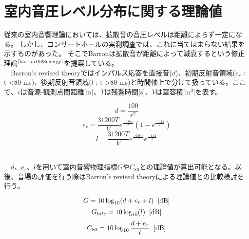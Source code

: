 \pagebreak
\section{室内音圧レベル分布に関する理論値}
従来の室内音響理論においては、拡散音の音圧レベルは距離によらず一定になる。
しかし、コンサートホールの実測調査では、これに当てはまらない結果を示すものがあった。
そこでBarronは拡散音が距離によって減衰するという修正理論$^{\text{\cite{barron1988energy}}}$を提案している。
\\　Barron's revised theoryではインパルス応答を直接音($d$)、初期反射音領域($e_r$ : t \textless 80 ms)、後期反射音領域($l$ : t \textgreater 80 ms)と時間軸上で分けて扱っている。ここで、$r$は音源-観測点間距離[m]、$T$は残響時間[s]、$V$は室容積[m$^3$]を表す。
\begin{table}[htbp]
    \begin{equation}
        \label{eq:d}
        d=\frac{100}{r^2}
    \end{equation}
    \begin{equation}
        e_r=\frac{31200T}{V}e^{\frac{-0.04r}{T}}(1-e^{\frac{-1.11}{T}})
    \end{equation}
    \begin{equation}
        l=\frac{31200T}{V}e^{\frac{-0.04r}{T}}e^{\frac{-1.11}{T}}
    \end{equation}
\end{table}
\\　$d$、$e_r$、$l$を用いて室内音響物理指標$G$や$C_{80}$との理論値が算出可能となる。以後、音場の評価を行う際はBarron's revised theoryによる理論値との比較検討を行う。
\begin{table}[htbp]
    \begin{equation}
        G=10\log_{10}(d+e_r+l)\hspace{2mm}\textrm{[dB]}
    \end{equation}
    \begin{equation}
        G_{late}=10\log_{10}(l)\hspace{2mm}\textrm{[dB]}
\\
    \end{equation}
    \begin{equation}
        C_{80}=10\log_{10}\frac{d+e_r}{l}\hspace{2mm}\textrm{[dB]}
    \end{equation}

\end{table}